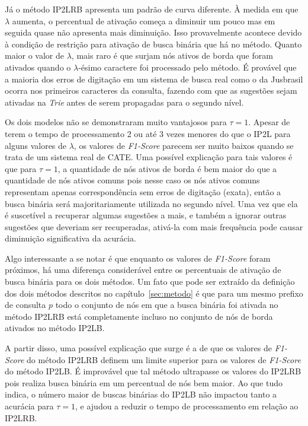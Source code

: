 Já o método IP2LRB apresenta um padrão de curva diferente. À medida em que $\lambda$ aumenta, o percentual de ativação começa a diminuir um pouco mas em seguida quase não apresenta mais diminuição. Isso provavelmente acontece devido à condição de restrição para ativação de busca binária que há no método. Quanto maior o valor de $\lambda$, mais raro é que surjam nós ativos de borda que foram ativados quando o $\lambda$-ésimo caractere foi processado pelo método. É provável que a maioria dos erros de digitação em um sistema de busca real como o da Jusbrasil ocorra nos primeiros caracteres da consulta, fazendo com que as sugestões sejam ativadas na \textit{Trie} antes de serem propagadas para o segundo nível.

Os dois modelos não se demonstraram muito vantajosos para $\tau=1$. Apesar de terem o tempo de processamento 2 ou até 3 vezes menores do que o IP2L para alguns valores de $\lambda$, os valores de \textit{F1-Score} parecem ser muito baixos quando se trata de um sistema real de CATE. Uma possível explicação para tais valores é que para $\tau=1$, a quantidade de nós ativos de borda é bem maior do que a quantidade de nós ativos comuns pois nesse caso os nós ativos comuns representam apenas correspondência sem erros de digitação (exata), então a busca binária será majoritariamente utilizada no segundo nível. Uma vez que ela é suscetível a recuperar algumas sugestões a mais, e também a ignorar outras sugestões que deveriam ser recuperadas, ativá-la com mais frequência pode causar diminuição significativa da acurácia.

Algo interessante a se notar é que enquanto os valores de \textit{F1-Score} foram próximos, há uma diferença considerável entre os percentuais de ativação de busca binária para os dois métodos. Um fato que pode ser extraído da definição dos dois métodos descritos no capítulo~\ref{sec:metodo} é que para um mesmo prefixo de consulta $p$ todo o conjunto de nós em que a busca binária foi ativada no método IP2LRB está completamente incluso no conjunto de nós de borda ativados no método IP2LB. 

A partir disso, uma possível explicação que surge é a de que os valores de \textit{F1-Score} do método IP2LRB definem um limite superior para os valores de \textit{F1-Score} do método IP2LB. É improvável que tal método ultrapasse os valores do IP2LRB pois realiza busca binária em um percentual de nós bem maior. Ao que tudo indica, o número maior de buscas binárias do IP2LB não impactou tanto a acurácia para $\tau=1$, e ajudou a reduzir o tempo de processamento em relação ao IP2LRB.

